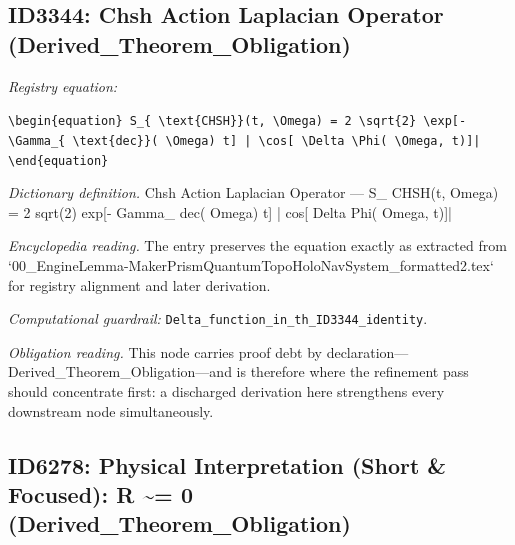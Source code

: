 \documentclass[11pt]{article}
\theoremstyle{remark}
\begin{document}
\subsection{ID3344: Chsh Action Laplacian Operator (Derived\_Theorem\_Obligation)}

\noindent\textit{Registry equation:}\par
{\small\texttt{\textbackslash{}begin\{equation\} S\_\{ \textbackslash{}text\{CHSH\}\}(t, \textbackslash{}Omega) = 2 \textbackslash{}sqrt\{2\} \textbackslash{}exp[- \textbackslash{}Gamma\_\{ \textbackslash{}text\{dec\}\}( \textbackslash{}Omega) t] | \textbackslash{}cos[ \textbackslash{}Delta \textbackslash{}Phi( \textbackslash{}Omega, t)]| \textbackslash{}end\{equation\}}}\par\medskip
\noindent\textit{Dictionary definition.} Chsh Action Laplacian Operator --- S\_ CHSH(t, Omega) = 2 sqrt(2) exp[- Gamma\_ dec( Omega) t] | cos[ Delta Phi( Omega, t)]|\par\medskip
\noindent\textit{Encyclopedia reading.} The entry preserves the equation exactly as extracted from `00\_EngineLemma-MakerPrismQuantumTopoHoloNavSystem\_formatted2.tex` for registry alignment and later derivation.
\par\medskip\noindent\textit{Computational guardrail:} \texttt{Delta\_function\_in\_th\_ID3344\_identity}.
\par\medskip\noindent\textit{Obligation reading.} This node carries proof debt by declaration---Derived\_Theorem\_Obligation---and is therefore where the refinement pass should concentrate first: a discharged derivation here strengthens every downstream node simultaneously.

\subsection{ID6278: Physical Interpretation (Short \& Focused): R \textasciitilde{}= 0 (Derived\_Theorem\_Obligation)}
\end{document}
